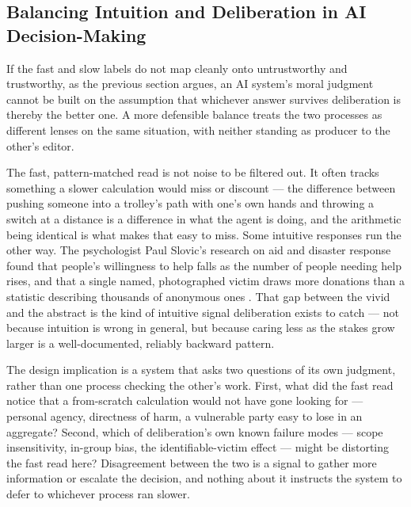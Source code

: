 \subsection{Balancing Intuition and Deliberation in AI Decision-Making}
\label{sec:5.3.2}
If the fast and slow labels do not map cleanly onto untrustworthy and trustworthy, as the previous section argues, an AI system's moral judgment cannot be built on the assumption that whichever answer survives deliberation is thereby the better one. A more defensible balance treats the two processes as different lenses on the same situation, with neither standing as producer to the other's editor.

The fast, pattern-matched read is not noise to be filtered out. It often tracks something a slower calculation would miss or discount — the difference between pushing someone into a trolley's path with one's own hands and throwing a switch at a distance is a difference in what the agent is doing, and the arithmetic being identical is what makes that easy to miss. Some intuitive responses run the other way. The psychologist Paul Slovic's research on aid and disaster response found that people's willingness to help falls as the number of people needing help rises, and that a single named, photographed victim draws more donations than a statistic describing thousands of anonymous ones \autocite{slovic2007mass}. That gap between the vivid and the abstract is the kind of intuitive signal deliberation exists to catch — not because intuition is wrong in general, but because caring less as the stakes grow larger is a well-documented, reliably backward pattern.

The design implication is a system that asks two questions of its own judgment, rather than one process checking the other's work. First, what did the fast read notice that a from-scratch calculation would not have gone looking for — personal agency, directness of harm, a vulnerable party easy to lose in an aggregate? Second, which of deliberation's own known failure modes — scope insensitivity, in-group bias, the identifiable-victim effect — might be distorting the fast read here? Disagreement between the two is a signal to gather more information or escalate the decision, and nothing about it instructs the system to defer to whichever process ran slower.

